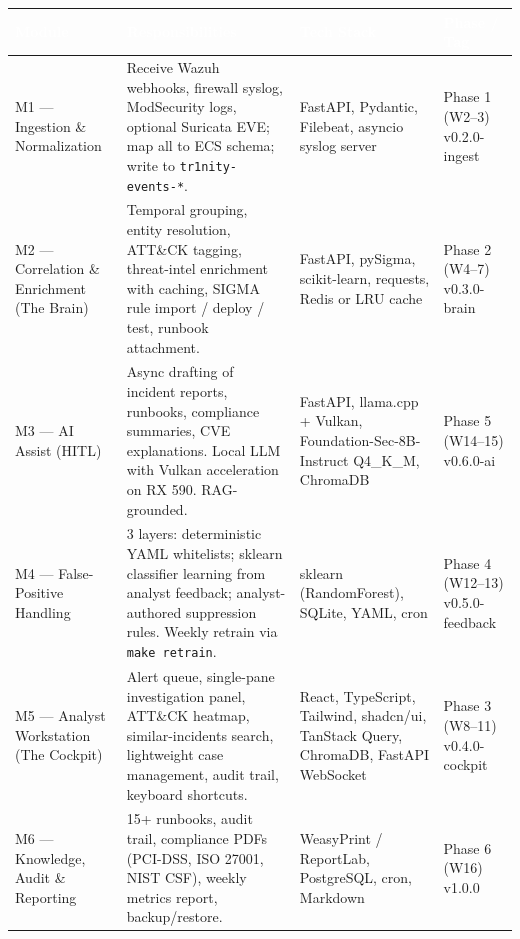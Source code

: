 \documentclass[11pt,a4paper]{article}
\begin{document}
\begin{longtable}{|>{}L{2.4cm}|L{4.6cm}|L{3.0cm}|L{4.5cm}|}
\hline
{}\textcolor{white}{\textbf{Module}} & \textcolor{white}{\textbf{Responsibilities}} & \textcolor{white}{\textbf{Tech Stack}} & \textcolor{white}{\textbf{Phase / Tag}} \\
\hline
\endhead
M1 — Ingestion \& Normalization & Receive Wazuh webhooks, firewall syslog, ModSecurity logs, optional Suricata EVE; map all to ECS schema; write to \texttt{tr1nity-events-*}. & FastAPI, Pydantic, Filebeat, asyncio syslog server & Phase 1 (W2--3) \newline v0.2.0-ingest \\
\hline
M2 — Correlation \& Enrichment (The Brain) & Temporal grouping, entity resolution, ATT\&CK tagging, threat-intel enrichment with caching, SIGMA rule import / deploy / test, runbook attachment. & FastAPI, pySigma, scikit-learn, requests, Redis or LRU cache & Phase 2 (W4--7) \newline v0.3.0-brain \\
\hline
M3 — AI Assist (HITL) & Async drafting of incident reports, runbooks, compliance summaries, CVE explanations. Local LLM with Vulkan acceleration on RX 590. RAG-grounded. & FastAPI, llama.cpp + Vulkan, Foundation-Sec-8B-Instruct Q4\_K\_M, ChromaDB & Phase 5 (W14--15) \newline v0.6.0-ai \\
\hline
M4 — False-Positive Handling & 3 layers: deterministic YAML whitelists; sklearn classifier learning from analyst feedback; analyst-authored suppression rules. Weekly retrain via \texttt{make retrain}. & sklearn (RandomForest), SQLite, YAML, cron & Phase 4 (W12--13) \newline v0.5.0-feedback \\
\hline
M5 — Analyst Workstation (The Cockpit) & Alert queue, single-pane investigation panel, ATT\&CK heatmap, similar-incidents search, lightweight case management, audit trail, keyboard shortcuts. & React, TypeScript, Tailwind, shadcn/ui, TanStack Query, ChromaDB, FastAPI WebSocket & Phase 3 (W8--11) \newline v0.4.0-cockpit \\
\hline
M6 — Knowledge, Audit \& Reporting & 15+ runbooks, audit trail, compliance PDFs (PCI-DSS, ISO 27001, NIST CSF), weekly metrics report, backup/restore. & WeasyPrint / ReportLab, PostgreSQL, cron, Markdown & Phase 6 (W16) \newline v1.0.0 \\
\hline
\end{longtable}
\end{document}

